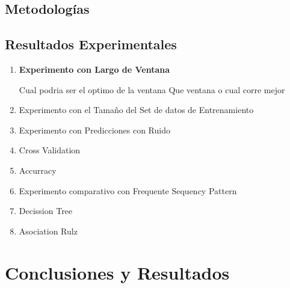 \subsection{Metodologías}





\subsection{Resultados Experimentales}


\begin{enumerate}
	
	\item \textbf{ Experimento con Largo de Ventana} 
	
	Cual podria ser el optimo de la ventana
	Que ventana o cual corre mejor
	
	
	
	\item Experimento con el Tamaño del Set de datos de Entrenamiento
	
	\item Experimento con Predicciones con Ruido
	
	\item Cross Validation
	
	
	\item Accurracy
	
	
	\item Experimento comparativo con Frequente Sequency Pattern
	
	\item Decission Tree
	
	\item Asociation Rulz
		
	
	
	
	
	
\end{enumerate}




\section{Conclusiones y Resultados}



